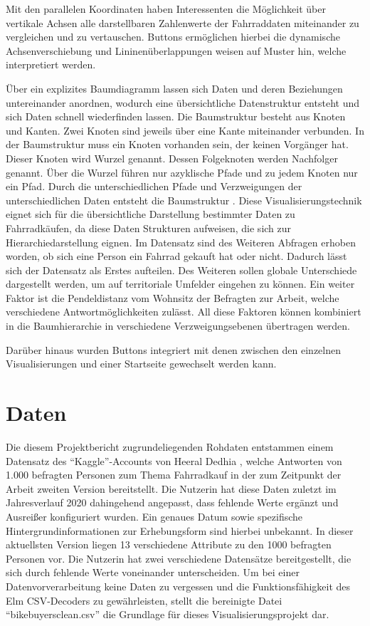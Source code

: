 \documentclass[usegeometry=true]{scrartcl}
\begin{document}
Mit den parallelen Koordinaten haben Interessenten die Möglichkeit über vertikale Achsen alle darstellbaren Zahlenwerte der Fahrraddaten miteinander zu vergleichen und zu vertauschen. Buttons ermöglichen hierbei die dynamische Achsenverschiebung und Lininenüberlappungen weisen auf Muster hin, welche interpretiert werden. 


Über ein explizites Baumdiagramm lassen sich Daten und deren Beziehungen untereinander anordnen, wodurch eine übersichtliche Datenstruktur entsteht und sich Daten schnell wiederfinden lassen. Die Baumstruktur besteht aus Knoten und Kanten. Zwei Knoten sind jeweils über eine Kante miteinander verbunden. In der Baumstruktur muss ein Knoten vorhanden sein, der keinen Vorgänger hat. Dieser Knoten wird Wurzel genannt. Dessen Folgeknoten werden Nachfolger genannt. Über die Wurzel führen nur azyklische Pfade und zu jedem Knoten nur ein Pfad. Durch die unterschiedlichen Pfade und Verzweigungen der unterschiedlichen Daten entsteht die Baumstruktur \cite{Gumm.2016}. Diese Visualisierungstechnik eignet sich für die übersichtliche Darstellung bestimmter Daten zu Fahrradkäufen, da diese Daten Strukturen aufweisen, die sich zur Hierarchiedarstellung eignen. Im Datensatz sind des Weiteren Abfragen erhoben worden, ob sich eine Person ein Fahrrad gekauft hat oder nicht. Dadurch lässt sich der Datensatz als Erstes aufteilen. Des Weiteren sollen globale Unterschiede dargestellt werden, um auf territoriale Umfelder eingehen zu können. Ein weiter Faktor ist die Pendeldistanz vom Wohnsitz der Befragten zur Arbeit, welche verschiedene Antwortmöglichkeiten zulässt. All diese Faktoren können kombiniert in die Baumhierarchie in verschiedene Verzweigungsebenen übertragen werden. 

Darüber hinaus wurden Buttons integriert mit denen zwischen den einzelnen Visualisierungen und einer Startseite gewechselt werden kann. 

\section{Daten}
Die diesem Projektbericht zugrundeliegenden Rohdaten entstammen einem Datensatz des "`Kaggle"'-Accounts von Heeral Dedhia \cite{Dedhia.22.09.2020}, welche Antworten von 1.000 befragten Personen zum Thema Fahrradkauf in der zum Zeitpunkt der Arbeit zweiten Version bereitstellt. Die Nutzerin hat diese Daten zuletzt im Jahresverlauf 2020 dahingehend angepasst, dass fehlende Werte ergänzt und Ausreißer konfiguriert wurden. Ein genaues Datum sowie spezifische Hintergrundinformationen zur Erhebungsform sind hierbei unbekannt. In dieser aktuellsten Version liegen 13 verschiedene Attribute zu den 1000 befragten Personen vor. Die Nutzerin hat zwei verschiedene Datensätze bereitgestellt, die sich durch fehlende Werte voneinander unterscheiden. Um bei einer Datenvorverarbeitung keine Daten zu vergessen und die Funktionsfähigkeit des Elm CSV-Decoders zu gewährleisten, stellt die bereinigte Datei "`bikebuyersclean.csv"' die Grundlage für dieses Visualisierungsprojekt dar.
\end{document}
